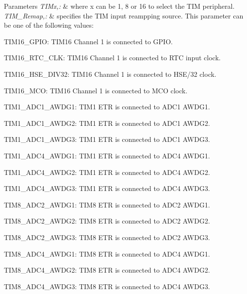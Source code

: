 \begin{DoxyParams}{Parameters}
{\em T\-I\-Mx,\-:} & where x can be 1, 8 or 16 to select the T\-I\-M peripheral. \\
\hline
{\em T\-I\-M\-\_\-\-Remap,\-:} & specifies the T\-I\-M input reampping source. This parameter can be one of the following values\-: \begin{DoxyItemize}
\item T\-I\-M16\-\_\-\-G\-P\-I\-O\-: T\-I\-M16 Channel 1 is connected to G\-P\-I\-O. \item T\-I\-M16\-\_\-\-R\-T\-C\-\_\-\-C\-L\-K\-: T\-I\-M16 Channel 1 is connected to R\-T\-C input clock. \item T\-I\-M16\-\_\-\-H\-S\-E\-\_\-\-D\-I\-V32\-: T\-I\-M16 Channel 1 is connected to H\-S\-E/32 clock. \item T\-I\-M16\-\_\-\-M\-C\-O\-: T\-I\-M16 Channel 1 is connected to M\-C\-O clock. \item T\-I\-M1\-\_\-\-A\-D\-C1\-\_\-\-A\-W\-D\-G1\-: T\-I\-M1 E\-T\-R is connected to A\-D\-C1 A\-W\-D\-G1. \item T\-I\-M1\-\_\-\-A\-D\-C1\-\_\-\-A\-W\-D\-G2\-: T\-I\-M1 E\-T\-R is connected to A\-D\-C1 A\-W\-D\-G2. \item T\-I\-M1\-\_\-\-A\-D\-C1\-\_\-\-A\-W\-D\-G3\-: T\-I\-M1 E\-T\-R is connected to A\-D\-C1 A\-W\-D\-G3. \item T\-I\-M1\-\_\-\-A\-D\-C4\-\_\-\-A\-W\-D\-G1\-: T\-I\-M1 E\-T\-R is connected to A\-D\-C4 A\-W\-D\-G1. \item T\-I\-M1\-\_\-\-A\-D\-C4\-\_\-\-A\-W\-D\-G2\-: T\-I\-M1 E\-T\-R is connected to A\-D\-C4 A\-W\-D\-G2. \item T\-I\-M1\-\_\-\-A\-D\-C4\-\_\-\-A\-W\-D\-G3\-: T\-I\-M1 E\-T\-R is connected to A\-D\-C4 A\-W\-D\-G3. \item T\-I\-M8\-\_\-\-A\-D\-C2\-\_\-\-A\-W\-D\-G1\-: T\-I\-M8 E\-T\-R is connected to A\-D\-C2 A\-W\-D\-G1. \item T\-I\-M8\-\_\-\-A\-D\-C2\-\_\-\-A\-W\-D\-G2\-: T\-I\-M8 E\-T\-R is connected to A\-D\-C2 A\-W\-D\-G2. \item T\-I\-M8\-\_\-\-A\-D\-C2\-\_\-\-A\-W\-D\-G3\-: T\-I\-M8 E\-T\-R is connected to A\-D\-C2 A\-W\-D\-G3. \item T\-I\-M8\-\_\-\-A\-D\-C4\-\_\-\-A\-W\-D\-G1\-: T\-I\-M8 E\-T\-R is connected to A\-D\-C4 A\-W\-D\-G1. \item T\-I\-M8\-\_\-\-A\-D\-C4\-\_\-\-A\-W\-D\-G2\-: T\-I\-M8 E\-T\-R is connected to A\-D\-C4 A\-W\-D\-G2. \item T\-I\-M8\-\_\-\-A\-D\-C4\-\_\-\-A\-W\-D\-G3\-: T\-I\-M8 E\-T\-R is connected to A\-D\-C4 A\-W\-D\-G3. \end{DoxyItemize}
\\
\hline
\end{DoxyParams}

